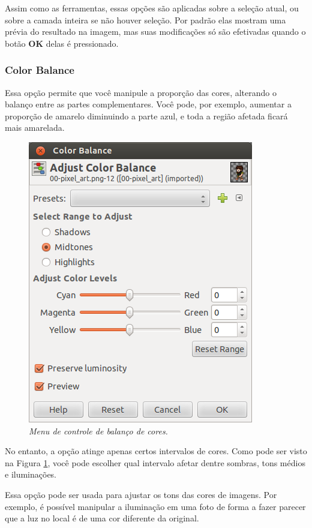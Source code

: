 \documentclass[12pt,onecolumn]{article}
\begin{document}
    Assim como as ferramentas, essas opções são aplicadas sobre a seleção atual,
    ou sobre a camada inteira se não houver seleção. Por padrão elas mostram uma
    prévia do resultado na imagem, mas suas modificações só são efetivadas quando
    o botão \textbf{OK} delas é pressionado.
    
      \subsubsection{Color Balance}
        Essa opção permite que você manipule a proporção das cores, alterando o
        balanço entre as partes complementares. Você pode, por exemplo, aumentar
        a proporção de amarelo diminuindo a parte azul, e toda a região afetada
        ficará mais amarelada.
      
        \begin{figure}[H]
          \centering
          \includegraphics[width=.6\linewidth]{screenshots/08-color_balance.png}
          \caption{
            \footnotesize
            \it
            Menu de controle de balanço de cores.
          }
          \label{fig:color_balance}
        \end{figure}
        
        No entanto, a opção atinge apenas certos intervalos de cores. Como pode
        ser visto na Figura \ref{fig:color_balance}, você pode escolher qual
        intervalo afetar dentre sombras, tons médios e iluminações.
        
        Essa opção pode ser usada para ajustar os tons das cores de imagens. Por
        exemplo, é possível manipular a iluminação em uma foto de forma a fazer
        parecer que a luz no local é de uma cor diferente da original.
      
\end{document}
